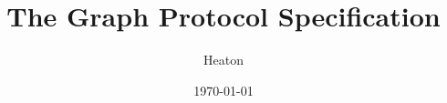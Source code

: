 


\usepackage{layouts}
\geometry{
  left=1.05in, %
  textwidth=5.0in, %
  marginparsep=0.15in, %
  marginparwidth=1.25in, %
  right=2.5in,  
  top=0.5in,
}
\setlength\topmargin{0.0in}

\usepackage{nameref} 
\usepackage{url} 


\usepackage[
  style=numeric,  
  backend=biber
]{biblatex}

 
\usepackage{xargs}

\setlength{\headheight}{0in}
\setlength{\voffset}{0in}
\setlength{\headsep}{0in}


\title{The Graph Protocol Specification}
\date{\today}
\author[]{Heaton}
\publisher{}
\usepackage{fancyhdr}
\pagestyle{fancy} %

                \renewcommand{\chaptermark}[1]{ \markboth{#1}{} }  %
                \renewcommand{\chaptername}{Chapter}
                \renewcommand{\sectionmark}[1]{ \markright{#1} } %

 

\usepackage[linktocpage=true]{hyperref}
\hypersetup{hidelinks}

